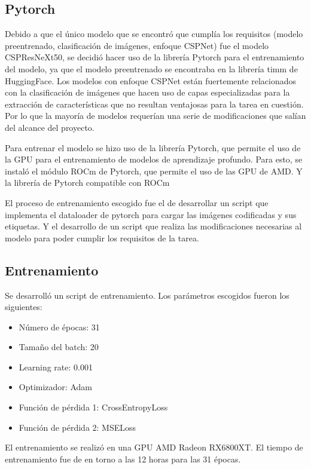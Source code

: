 \subsection{Pytorch}
Debido a que el único modelo que se encontró que cumplía los requisitos (modelo preentrenado, clasificación de imágenes, enfoque CSPNet) fue el modelo CSPResNeXt50, se decidió hacer uso de la librería Pytorch para el entrenamiento del modelo, ya que el modelo preentrenado se encontraba en la librería timm de HuggingFace.
Los modelos con enfoque CSPNet están fuertemente relacionados con la clasificación de imágenes que hacen uso de capas especializadas para la extracción de características que no resultan ventajosas para la tarea en cuestión. Por lo que la mayoría de modelos requerían una serie de modificaciones que salían del alcance del proyecto.

Para entrenar el modelo se hizo uso de la librería Pytorch, que permite el uso de la GPU para el entrenamiento de modelos de aprendizaje profundo.
Para esto, se instaló el módulo ROCm de Pytorch, que permite el uso de las GPU de AMD. Y la librería de Pytorch compatible con ROCm

El proceso de entrenamiento escogido fue el de desarrollar un script que implementa el dataloader de pytorch para cargar las imágenes codificadas y sus etiquetas. Y el desarrollo de un script que realiza las modificaciones necesarias al modelo para poder cumplir los requisitos de la tarea.  


\subsection{Entrenamiento}
Se desarrolló un script de entrenamiento. Los parámetros escogidos fueron los siguientes:
\begin{itemize}
    \item Número de épocas: 31
    \item Tamaño del batch: 20
    \item Learning rate: 0.001
    \item Optimizador: Adam
    \item Función de pérdida 1: CrossEntropyLoss
    \item Función de pérdida 2: MSELoss
\end{itemize}

El entrenamiento se realizó en una GPU AMD Radeon RX6800XT. El tiempo de entrenamiento fue de en torno a las 12 horas para las 31 épocas.

